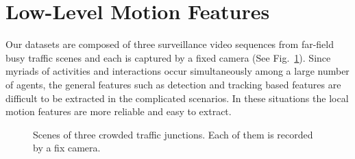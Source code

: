 \section{Low-Level Motion Features}
\label{framework:low-level}
Our datasets are composed of three surveillance video sequences from far-field busy traffic scenes and each is captured by a fixed camera (See Fig.~\ref{fig:traffic_junction}). Since myriads of activities and interactions occur simultaneously among a large number of agents, the general features such as detection and tracking based features are difficult to be extracted in the complicated scenarios. In these situations the local motion features are more reliable and easy to extract. 
\begin{figure}[!htbp]
	\centering
	\caption[Examples of datasets ]
	{Scenes of three crowded traffic junctions. Each of them is recorded by a fix camera.}
	\label{fig:traffic_junction}
\end{figure}


